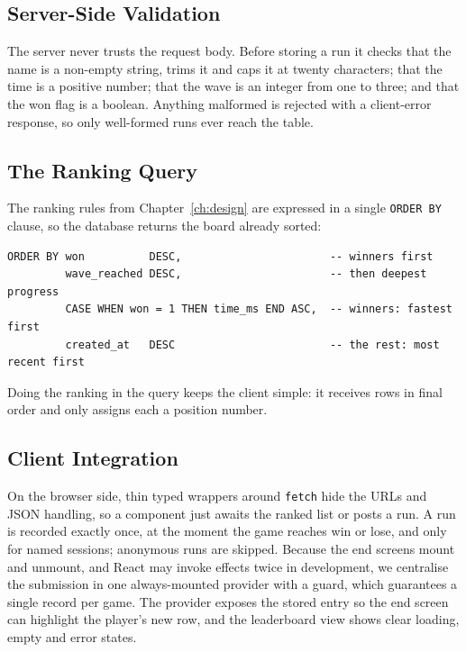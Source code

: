 \documentclass[12pt,a4paper]{report}
\begin{document}
\subsection{Server-Side Validation}

The server never trusts the request body. Before storing a run it checks that
the name is a non-empty string, trims it and caps it at twenty characters; that
the time is a positive number; that the wave is an integer from one to three;
and that the won flag is a boolean. Anything malformed is rejected with a
client-error response, so only well-formed runs ever reach the table.

\subsection{The Ranking Query}

The ranking rules from Chapter~\ref{ch:design} are expressed in a single
\texttt{ORDER BY} clause, so the database returns the board already sorted:

\begin{verbatim}
ORDER BY won          DESC,                       -- winners first
         wave_reached DESC,                       -- then deepest progress
         CASE WHEN won = 1 THEN time_ms END ASC,  -- winners: fastest first
         created_at   DESC                        -- the rest: most recent first
\end{verbatim}

Doing the ranking in the query keeps the client simple: it receives rows in
final order and only assigns each a position number.

\subsection{Client Integration}

On the browser side, thin typed wrappers around \texttt{fetch} hide the URLs and
JSON handling, so a component just awaits the ranked list or posts a run. A run
is recorded exactly once, at the moment the game reaches win or lose, and only
for named sessions; anonymous runs are skipped. Because the end screens mount and
unmount, and React may invoke effects twice in development, we centralise the
submission in one always-mounted provider with a guard, which guarantees a single
record per game. The provider exposes the stored entry so the end screen can
highlight the player's new row, and the leaderboard view shows clear loading,
empty and error states.
\end{document}
